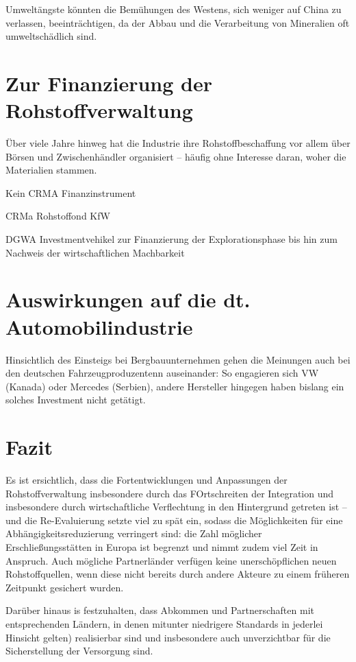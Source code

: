 \documentclass[12pt,a4paper,oneside]{book} %
\begin{document}
Umweltängste könnten die Bemühungen des Westens, sich weniger auf China zu verlassen, beeinträchtigen, da der Abbau und die Verarbeitung von Mineralien oft umweltschädlich sind.

\section{Zur Finanzierung der Rohstoffverwaltung}

Über viele Jahre hinweg hat die Industrie ihre Rohstoffbeschaffung vor allem über Börsen und Zwischenhändler organisiert – häufig ohne Interesse daran, woher die Materialien stammen.\autocite{https://www.africa-business-guide.de/de/praxis/erfahrungen/schluesselrolle-afrikas-bedeutung-bei-den-kritischen-rohstoffen--1920084}

Kein CRMA Finanzinstrument

CRMa Rohstoffond KfW

DGWA Investmentvehikel zur Finanzierung der Explorationsphase bis hin zum Nachweis der wirtschaftlichen Machbarkeit

\section{Auswirkungen auf die dt. Automobilindustrie}



Hinsichtlich des Einsteigs bei Bergbauunternehmen gehen die Meinungen auch bei den deutschen Fahrzeugproduzentenn auseinander: So engagieren sich VW (Kanada) oder Mercedes (Serbien), andere Hersteller hingegen haben bislang ein solches Investment nicht getätigt.

\section{Fazit}

Es ist ersichtlich, dass die Fortentwicklungen und Anpassungen der Rohstoffverwaltung insbesondere durch das FOrtschreiten der Integration und insbesondere durch wirtschaftliche Verflechtung in den Hintergrund getreten ist -- und die Re-Evaluierung setzte viel zu spät ein, sodass die Möglichkeiten für eine Abhängigkeitsreduzierung verringert sind: die Zahl möglicher Erschließungsstätten in Europa ist begrenzt und nimmt zudem viel Zeit in Anspruch. Auch mögliche Partnerländer verfügen keine unerschöpflichen neuen Rohstoffquellen, wenn diese nicht bereits durch andere Akteure zu einem früheren Zeitpunkt gesichert wurden.

Darüber hinaus is festzuhalten, dass Abkommen und Partnerschaften mit entsprechenden Ländern, in denen mitunter niedrigere Standards in jederlei Hinsicht gelten) realisierbar sind und insbesondere auch unverzichtbar für die Sicherstellung der Versorgung sind.


	
\end{document}
